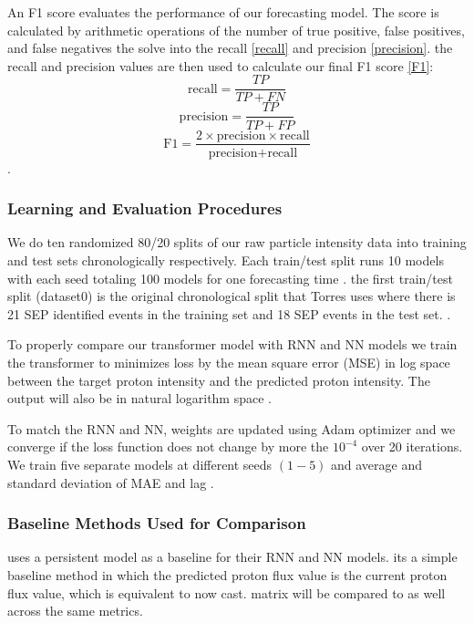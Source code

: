 An F1 score evaluates the performance of our forecasting model. The score is calculated by arithmetic operations of the number of true positive, false positives, and false negatives the solve into the recall \eqref{recall} and precision \eqref{precision}. the recall and precision values are then used to calculate our final F1 score \eqref{F1}:
\begin{equation}
    \label{recall}
    \text{recall} = \frac{TP}{TP + FN} 
\end{equation}
\begin{equation}
    \label{precision}
    \text{precision} = \frac{TP}{TP+FP}
\end{equation}
\begin{equation}
    \label{F1}
    \text{F1} = \frac{2 \times \text{precision} \times \text{recall}}{\text{precision} + \text{recall}}
\end{equation}.
\subsubsection{Learning and Evaluation Procedures}
We do ten randomized 80/20 splits of  our raw particle intensity data into training and test sets chronologically respectively. Each train/test split runs 10 models with each seed totaling 100 models for one forecasting time \cite{pastore2021extrapolating} . the first train/test split (dataset0) is the original chronological split that Torres uses where there is 21 SEP identified events in the training set and 18 SEP events in the test set. . 

To properly compare our transformer model with RNN and NN models we train the transformer to minimizes loss by the mean square error (MSE) in log space between the target proton intensity and the predicted proton intensity. The output will also be in natural logarithm space \cite{torres2025machine}.

To match the RNN and NN, weights are updated using Adam optimizer and we converge if the loss function does not change by more the $10^{-4}$ over 20 iterations. We train five separate models at different seeds $(1-5)$ and average and standard deviation of MAE and lag \cite{torres2025machine}.



\subsubsection{Baseline Methods Used for Comparison}
\cite{torres2025machine} uses a persistent model as a baseline for their RNN and NN models. its a simple baseline method in which the predicted proton flux value is the current proton flux value, which is equivalent to now cast. \cite{posner2007forecasting} matrix will be compared to as well across the same metrics.

